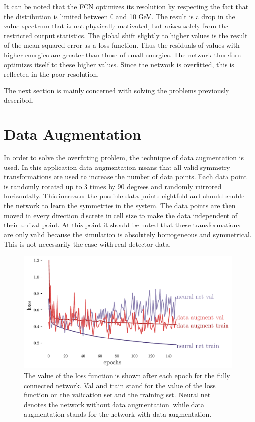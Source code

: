 \documentclass[12pt, a4paper]{thesis}
\begin{document}
It can be noted that the FCN optimizes its resolution by respecting
the fact that the distribution is limited between 0 and 10 GeV. The
result is a drop in the value spectrum that is not physically
motivated, but arises solely from the restricted output statistics.
The global shift slightly to higher values is the result of the mean
squared error as a loss function. Thus the residuals of values with
higher energies are greater than those of small energies. The network
therefore optimizes itself to these higher values. Since the network
is overfitted, this is reflected in the poor resolution.

The next section is mainly concerned with solving the problems
previously described.

\section{Data Augmentation}
\label{sec:org4a347fb}

In order to solve the overfitting problem, the technique of data
augmentation is used. In this application data augmentation means that
all valid symmetry transformations are used to increase the number of
data points. Each data point is randomly rotated up to 3 times by 90
degrees and randomly mirrored horizontally. This increases the
possible data points eightfold and should enable the network to learn
the symmetries in the system. The data points are then moved in every
direction discrete in cell size to make the data independent of their
arrival point. At this point it should be noted that these
transformations are only valid because the simulation is absolutely
homogeneous and symmetrical. This is not necessarily the case with
real detector data.

\begin{figure}[hbtp]
  \centering
  \includegraphics[width=.9\linewidth]{../images/data_augment_loss.pdf}
  \caption{The value of the loss function is shown after each epoch
    for the fully connected network. Val and train stand for the value
    of the loss function on the validation set and the training
    set. Neural net denotes the network without data augmentation,
    while data augmentation stands for the network with data
    augmentation.}
  \label{da_loss}
\end{figure} 
\end{document}
